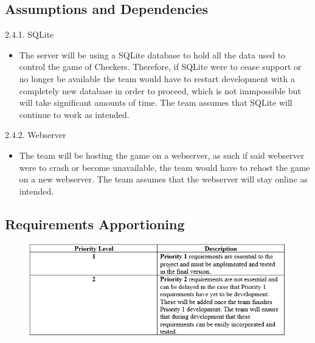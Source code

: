 \documentclass[10pt]{article}
\begin{document}
\subsection{Assumptions and Dependencies}

\begin{flushleft}
    {\large 2.4.1. SQLite}
        \begin{itemize}
            \item The server will be using a SQLite database to hold all the data used to control the game of Checkers. Therefore, if SQLite were to cease support or no longer be available the team would have to restart development with a completely new database in order to proceed, which is not immpossible but will take significant amounts of time. The team assumes that SQLite will continue to work as intended.            
        \end{itemize}
\end{flushleft}

\begin{flushleft}
    {\large 2.4.2. Webserver}
        \begin{itemize}
            \item The team will be hosting the game on a webserver, as such if said webserver were to crash or become unavailable, the team would have to rehost the game on a new webserver. The team assumes that the webserver will stay online as intended.
        \end{itemize}
\end{flushleft}

\subsection{Requirements Apportioning}
\begin{figure}[h!]
    \begin{flushright}
        \includegraphics[width=13cm]{Priority Chart.png}
    \end{flushright}
\end{figure}
\pagebreak
\end{document}
